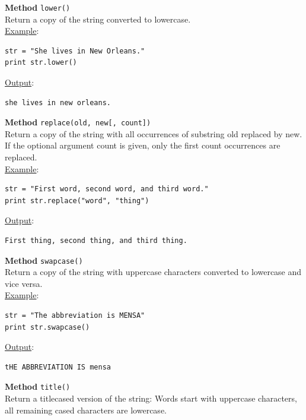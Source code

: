 \noindent
{\bf Method} {\tt lower()}\\

\noindent
Return a copy of the string converted to lowercase.\\

\noindent
\underline{Example}:
\begin{verbatim}
str = "She lives in New Orleans."
print str.lower()
\end{verbatim}
\underline{Output}:
\begin{verbatim}
she lives in new orleans.
\end{verbatim}
\vspace{4mm}

\noindent
{\bf Method} {\tt replace(old, new[, count])}\\

\noindent
Return a copy of the string with all occurrences of substring old replaced by new. 
If the optional argument count is given, only the first count occurrences are replaced.\\

\noindent
\underline{Example}:
\begin{verbatim}
str = "First word, second word, and third word."
print str.replace("word", "thing")
\end{verbatim}
\underline{Output}:
\begin{verbatim}
First thing, second thing, and third thing.
\end{verbatim}
\vspace{4mm}

\noindent
{\bf Method} {\tt swapcase()}\\

\noindent
Return a copy of the string with uppercase characters converted to lowercase and vice versa.\\

\noindent
\underline{Example}:
\begin{verbatim}
str = "The abbreviation is MENSA"
print str.swapcase()
\end{verbatim}
\underline{Output}:
\begin{verbatim}
tHE ABBREVIATION IS mensa
\end{verbatim}
\vspace{4mm}

\noindent
{\bf Method} {\tt title()}\\

\noindent
Return a titlecased version of the string: Words start with uppercase characters, 
all remaining cased characters are lowercase.\\

